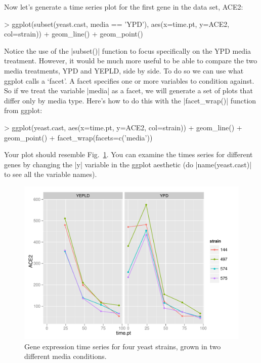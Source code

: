 Now let's generate a time series plot for the first gene in the data set, ACE2:
\begin{R}
> ggplot(subset(yeast.cast, media == 'YPD'), 
        aes(x=time.pt, y=ACE2, col=strain)) + geom_line() + geom_point()
\end{R}
%
Notice the use of the |subset()| function to focus specifically on the YPD media treatment.  However, it would be much more useful to be able to compare the two media treatments, YPD and YEPLD, side by side.  To do so we can use what ggplot calls a `facet'.  A facet  specifies one or more variables to condition against.  So if we treat the variable |media| as a facet, we will generate a set of plots that differ only by media type.  Here's how to do this  with the |facet_wrap()| function from ggplot:
\begin{R}
> ggplot(yeast.cast, aes(x=time.pt, y=ACE2, col=strain)) + geom_line() + geom_point() + facet_wrap(facets=c('media'))
\end{R}
%
Your plot should resemble Fig.~\ref{fig:yeasttime}.  You can examine the times series for different genes by changing the |y| variable in the ggplot aesthetic (do |name(yeast.cast)| to see all the variable names).
%
\begin{figure}[htbp]
\centering
\includegraphics[width=0.7\columnwidth]{./figures/hands-on3/yeast-timeseries-plot.pdf}
\caption{Gene expression time series for four yeast strains, grown in two different media conditions.\label{fig:yeasttime}}
\end{figure}


\medskip

